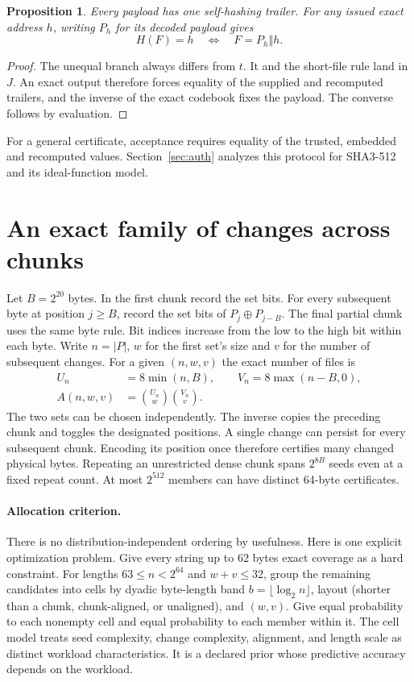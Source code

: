 \documentclass[10pt,twocolumn,letterpaper]{article}
\newtheorem{prop}{Proposition}
\newcommand{\cat}{\mathbin\Vert}
\newcommand{\xor}{\mathbin\oplus}
\begin{document}
\begin{prop}
Every payload has one self-hashing trailer. For any issued exact address \(h\), writing \(P_h\) for its decoded payload gives
\[
                H(F)=h \quad\Longleftrightarrow\quad F=P_h\cat h .
\]
\end{prop}
\begin{proof}
The unequal branch always differs from \(t\). It and the short-file rule land in \(J\). An exact output therefore forces equality of the supplied and recomputed trailers, and the inverse of the exact codebook fixes the payload. The converse follows by evaluation.
\end{proof}

For a general certificate, acceptance requires equality of the trusted, embedded and recomputed values. Section~\ref{sec:auth} analyzes this protocol for SHA3-512~\cite{nist} and its ideal-function model.

\section{An exact family of changes across chunks}
Let \(B=2^{20}\) bytes. In the first chunk record the set bits. For every subsequent byte at position \(j\ge B\), record the set bits of \(P_j\xor P_{j-B}\). The final partial chunk uses the same byte rule. Bit indices increase from the low to the high bit within each byte. Write \(n=|P|\), \(w\) for the first set's size and \(v\) for the number of subsequent changes. For a given \((n,w,v)\) the exact number of files is
\begin{align}
 U_n&=8\min(n,B),\qquad V_n=8\max(n-B,0),\nonumber\\
 A(n,w,v)&=\binom{U_n}{w}\binom{V_n}{v}. \label{eq:count}
\end{align}
The two sets can be chosen independently. The inverse copies the preceding chunk and toggles the designated positions. A single change can persist for every subsequent chunk. Encoding its position once therefore certifies many changed physical bytes. Repeating an unrestricted dense chunk spans \(2^{8B}\) seeds even at a fixed repeat count. At most \(2^{512}\) members can have distinct 64-byte certificates.

\paragraph{Allocation criterion.}
There is no distribution-independent ordering by usefulness. Here is one explicit optimization problem. Give every string up to 62 bytes exact coverage as a hard constraint. For lengths \(63\le n<2^{64}\) and \(w+v\le32\), group the remaining candidates into cells by dyadic byte-length band \(b=\lfloor\log_2 n\rfloor\), layout (shorter than a chunk, chunk-aligned, or unaligned), and \((w,v)\). Give equal probability to each nonempty cell and equal probability to each member within it. The cell model treats seed complexity, change complexity, alignment, and length scale as distinct workload characteristics. It is a declared prior whose predictive accuracy depends on the workload.
\end{document}
